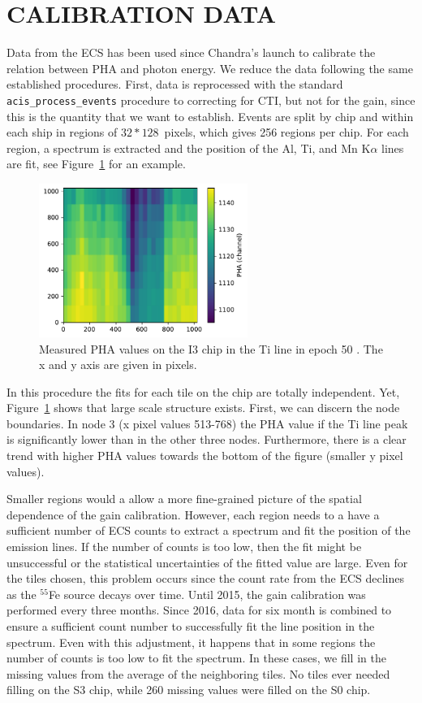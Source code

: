 \documentclass[]{spie}  %
\begin{document}
\section{CALIBRATION DATA}
Data from the ECS has been used since Chandra's launch to calibrate the relation between PHA and photon energy. We reduce the data following the same established procedures. First, data is reprocessed with the standard \texttt{acis\_process\_events} procedure to correcting for CTI, but not for the gain, since this is the quantity that we want to establish. Events are split by chip and within each ship in regions of $32*128$~pixels, which gives 256 regions per chip. For each region, a spectrum is extracted and the position of the Al, Ti, and Mn K$\alpha$ lines are fit, see Figure~\ref{fig:example} for an example.
\begin{figure} [ht]
  \begin{center}
    \includegraphics[height=5cm]{figures/i1e50Ti.pdf}
  \end{center}
  \caption
      {Measured PHA values on the I3 chip in the Ti line in epoch 50 \label{fig:example}. The x and y axis are given in pixels.
}
\end{figure}
In this procedure the fits for each tile on the chip are totally independent. Yet, Figure~\ref{fig:example} shows that large scale structure exists. First, we can discern the node boundaries. In node 3 (x pixel values 513-768) the PHA value if the Ti line peak is significantly lower than in the other three nodes. Furthermore, there is a clear trend with higher PHA values towards the bottom of the figure (smaller y pixel values).

Smaller regions would a allow a more fine-grained picture of the spatial dependence of the gain calibration. However, each region needs to a have a sufficient number of ECS counts to extract a spectrum and fit the position of the emission lines. If the number of counts is too low, then the fit might be unsuccessful or the statistical uncertainties of the fitted value are large. Even for the tiles chosen, this problem occurs since the count rate from the ECS declines as the $^{55}$Fe source decays over time. Until 2015, the gain calibration was performed every three months. Since 2016, data for six month is combined to ensure a sufficient count number to successfully fit the line position in the spectrum. Even with this adjustment, it happens that in some regions the number of counts is too low to fit the spectrum. In these cases, we fill in the missing values from the average of the neighboring tiles. No tiles ever needed filling on the S3 chip, while 260 missing values were filled on the S0 chip.
\end{document}
